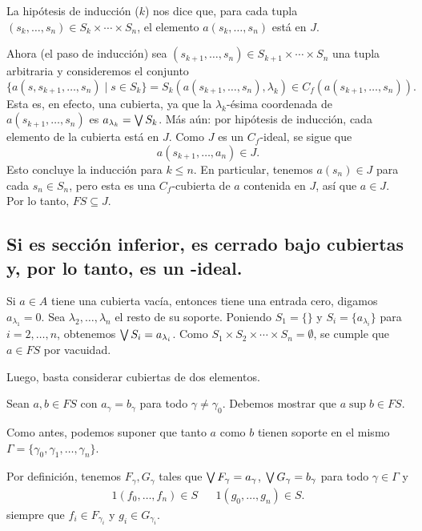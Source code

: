 La hipótesis de inducción ($k$) nos dice que, para cada tupla
$(s_k,\dots,s_n)\in S_k\times\cdots\times S_n$,
el elemento $a(s_k,\dots,s_n)$ está en $J$.

Ahora (el paso de inducción)
sea $(s_{k+1},\dots,s_n)\in S_{k+1}\times\cdots\times S_n$
una tupla arbitraria y consideremos el conjunto
\[
  \{a(s,s_{k+1},\dots,s_n) \mid s\in S_k\}
  =
  S_k(a(s_{k+1},\dots,s_n),\lambda_k)
  \in
  C_f(a(s_{k+1},\dots,s_n))
.\]
Esta es, en efecto, una cubierta, ya que la $\lambda_k$-ésima
coordenada de $a(s_{k+1},\dots,s_n)$ es $a_{\lambda_k}=\bigvee S_k$.
Más aún: por hipótesis de inducción, cada elemento
de la cubierta está en $J$.
Como $J$ es un $C_f$-ideal, se sigue que
\[
  a(s_{k+1},\dots,a_n) \in J
.\]
Esto concluye la inducción para $k\leq n$.
En particular, tenemos $a(s_n)\in J$ para cada $s_n\in S_n$,
pero esta es una $C_f$-cubierta de $a$ contenida en $J$,
así que $a\in J$.
Por lo tanto, $FS\subseteq J$.

\subsection{Si  es sección inferior,  es cerrado bajo
cubiertas y, por lo tanto, es un -ideal.}

Si $a\in A$ tiene una cubierta vacía, entonces tiene una entrada
cero, digamos $a_{\lambda_1}=0$.
Sea $\lambda_2,\dots,\lambda_n$ el resto de su soporte.
Poniendo $S_1=\{\}$ y $S_i=\{a_{\lambda_i}\}$ para $i=2,\dots,n$,
obtenemos $\bigvee S_i = a_{\lambda_i}$.
Como $S_1\times S_2\times\cdots\times S_n=\emptyset$,
se cumple que $a\in FS$ por vacuidad.

Luego, basta considerar cubiertas de dos elementos.

Sean $a,b\in FS$ con $a_\gamma=b_\gamma$ para todo
$\gamma\neq\gamma_0$.
Debemos mostrar que $a\sup b\in FS$.

Como antes, podemos suponer que tanto $a$ como $b$ tienen soporte
en el mismo $\Gamma=\{\gamma_0,\gamma_1,\dots,\gamma_n\}$.

Por definición, tenemos $F_\gamma,G_\gamma$ tales que $\bigvee
F_\gamma = a_\gamma$, $\bigvee G_\gamma = b_\gamma$ para todo
$\gamma\in\Gamma$ y
\begin{align*}
  1(f_0,\dots,f_n)\in S && 1(g_0,\dots,g_n)\in S.
\end{align*}
siempre que $f_i\in F_{\gamma_i}$ y $g_i\in G_{\gamma_i}$.

